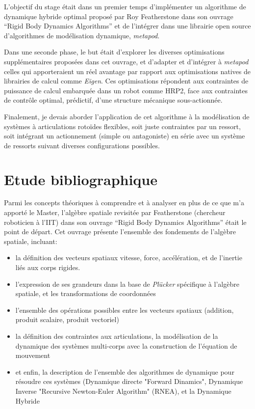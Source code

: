 \documentclass{report}
\begin{document}
L'objectif du stage était dans un premier temps d'implémenter un algorithme de dynamique hybride optimal proposé par Roy Featherstone dans son ouvrage “Rigid Body Dynamics Algorithms” \cite{bib_featherstone} et de l'intégrer dans une librairie open source d'algorithmes de modélisation dynamique, \emph{metapod}.

Dans une seconde phase, le but était d'explorer les diverses optimisations supplémentaires proposées dans cet ouvrage, et d'adapter et d'intégrer à \emph{metapod} celles qui apporteraient un réel avantage par rapport aux optimisations natives de librairies de calcul comme \emph{Eigen}. Ces optimisations répondent aux contraintes de puissance de calcul embarquée dans un robot comme HRP2, face aux contraintes de contrôle optimal, prédictif, d'une structure mécanique sous-actionnée.

Finalement, je devais aborder l'application de cet algorithme à la modélisation de systèmes à articulations rotoïdes flexibles, soit juste contraintes par un ressort, soit intégrant un actionnement (simple ou antagoniste) en série avec un système de ressorts suivant diverses configurations possibles.

\section*{Etude bibliographique}
Parmi les concepts théoriques à comprendre et à analyser en plus de ce que m'a apporté le Master, l'algèbre spatiale revisitée par Featherstone (chercheur roboticien à l'IIT) dans son ouvrage “Rigid Body Dynamics Algorithms” \cite{bib_featherstone} était le point de départ. Cet ouvrage présente l'ensemble des fondements de l'algèbre spatiale, incluant:

\begin{itemize}
\item la définition des vecteurs spatiaux vitesse, force, accélération, et de l'inertie liés aux corps rigides.
\item l'expression de ses grandeurs dans la base de \emph{Plücker} spécifique à l'algèbre spatiale, et les transformations de coordonnées
\item l'ensemble des opérations possibles entre les vecteurs spatiaux (addition, produit scalaire, produit vectoriel)
\item la définition des contraintes aux articulations, la modélisation de la dynamique des systèmes multi-corps avec la construction de l'équation de mouvement
\item et enfin, la description de l'ensemble des algorithmes de dynamique pour résoudre ces systèmes (Dynamique directe "Forward Dinamics", Dynamique Inverse "Recursive Newton-Euler Algorithm" (RNEA), et la Dynamique Hybride
\end{itemize}
\end{document}
